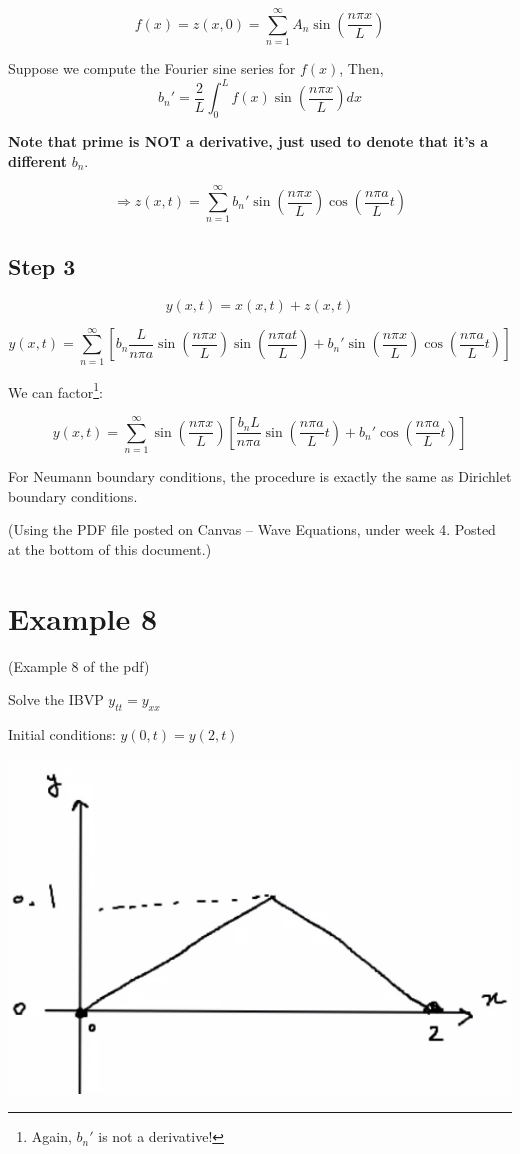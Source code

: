 $$f(x) = z(x,0) = \sum_{n =1}^\infty  A_n \sin \left( \frac{n \pi x}{L} \right)$$

Suppose we compute the Fourier sine series for $f(x)$, Then, $$b_n' = \frac{2}{L} \int_0^L f(x) \sin \left( \frac{n \pi x}{L} \right) dx$$

\textbf{Note that prime is NOT a derivative, just used to denote that it's a different} $b_n$.

$$\Rightarrow z(x,t) = \sum_{n = 1}^\infty b_n' \sin \left( \frac{n \pi x}{L} \right) \cos \left( \frac{n \pi a}{L} t \right)$$

\subsection{Step 3}

$$y(x,t) = x(x,t) + z(x,t)$$

$$ y(x,t) = \sum_{n = 1}^\infty \left[ b_n \frac{L}{n \pi a} \sin \left( \frac{n \pi x}{L} \right) \sin \left( \frac{n \pi a t}{L} \right) + b_n' \sin \left( \frac{n \pi x}{L} \right) \cos \left( \frac{n \pi a}{L} t \right) \right]$$

We can factor\footnote{Again, $b_n'$ is not a derivative!}:

$$y(x,t) = \sum_{n = 1}^\infty \sin \left( \frac{n \pi x}{L} \right) \left[ \frac{b_n L}{n \pi a} \sin \left( \frac{n \pi a}{L}  t \right) + b_n' \cos \left( \frac{n \pi a}{L}  t \right) \right]$$

\hfill

For Neumann boundary conditions, the procedure is exactly the same as Dirichlet boundary conditions. 

(Using the PDF file posted on Canvas -- Wave Equations, under week 4. Posted at the bottom of this document.)

\section{Example 8}

(Example 8 of the pdf)

Solve the IBVP $y_{tt} = y_{xx}$

Initial conditions: $y(0,t) = y(2,t)$

\includegraphics[width = 0.8 \textwidth]{image2.png}

